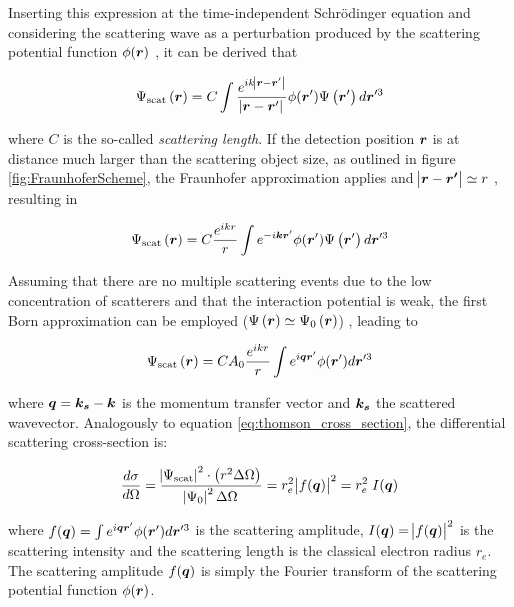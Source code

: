 Inserting this expression at the time-independent Schrödinger equation and considering the scattering wave as a perturbation produced by the scattering potential function $\phi(\bm{r})$ \citep{cowley_diffraction_1995}, it can be derived that

\begin{equation}
       \Psi_{\text{scat}}\left( \bm{r} \right)=C \int \frac{e^{ i k\abs{\bm{r}-\bm{r}'} } } {\abs{\bm{r}-\bm{r}'}} \phi(\bm{r}')   \Psi\left( \bm{r}' \right) d\bm{r}'^3
\end{equation}

where $C$ is the so-called \emph{scattering length}. If the detection position $\bm{r}$ is at distance much larger than the scattering object size, as outlined in figure \ref{fig:FraunhoferScheme}, the Fraunhofer approximation applies and $\abs{\bm{r}-\bm{r'}} \simeq r$ \citep{feigin_structure_1987}, resulting in

\begin{equation}
       \Psi_{\text{scat}}\left( \bm{r} \right)=C \frac{e^{i k r}}{r} \int e^{ -i \bm{k}\bm{r}' }  \phi(\bm{r}')   \Psi\left( \bm{r}' \right) d\bm{r}'^3
\end{equation}

Assuming that there are no multiple scattering events due to the low concentration of scatterers and that the interaction potential is weak, the first Born approximation can be employed ($ \Psi\left( \bm{r} \right) \simeq \Psi_0\left( \bm{r} \right)$) \citep{cowley_diffraction_1995}, leading to

\begin{equation}
       \Psi_{\text{scat}}\left( \bm{r} \right)=C A_0 \frac{e^{i k r}}{r} \int e^{ i \bm{q}\bm{r}' }  \phi(\bm{r}')  d\bm{r}'^3
\end{equation}

where $\bm{q}=\bm{k_s} - \bm{k}$ is the momentum transfer vector and $\bm{k_s}$ the scattered wavevector. Analogously to equation \ref{eq:thomson_cross_section}, the differential scattering cross-section is:

\begin{equation}
        \label{eq:rayleigh_cross_section}
\frac{d\sigma}{d\Omega}= \frac{\abs{\Psi_{\text{scat}}}^2 \cdot \left(r^2 \Delta \Omega \right)}{\abs{\Psi_{0}}^2\Delta \Omega}=r_e^2 \abs{f(\bm{q})}^2 =r_e^2 \; I(\bm{q})
\end{equation}

where $f(\bm{q})=\int e^{ i \bm{q}\bm{r}' }  \phi(\bm{r}')  d\bm{r}'^3$ is the scattering amplitude, $I(\bm{q}) = \abs{f(\bm{q})}^2$ is the scattering intensity and the scattering length is the classical electron radius $r_e$. The scattering amplitude  $f(\bm{q})$ is simply the Fourier transform of the scattering potential function $\phi(\bm{r})$.

